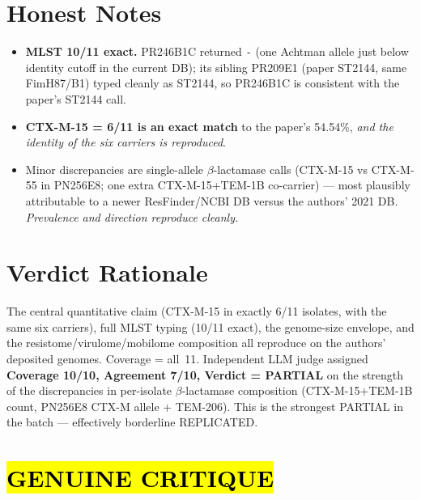 \documentclass[11pt]{article}
\begin{document}
\section{Honest Notes}
\begin{itemize}[leftmargin=1.2em]
  \item \textbf{MLST 10/11 exact.} PR246B1C returned \texttt{-} (one Achtman
        allele just below identity cutoff in the current DB); its sibling
        PR209E1 (paper ST2144, same FimH87/B1) typed cleanly as ST2144, so
        PR246B1C is consistent with the paper's ST2144 call.
  \item \textbf{CTX-M-15 = 6/11 is an exact match} to the paper's 54.54\%,
        \emph{and the identity of the six carriers is reproduced}.
  \item Minor discrepancies are single-allele $\beta$-lactamase calls (CTX-M-15
        vs CTX-M-55 in PN256E8; one extra CTX-M-15+TEM-1B co-carrier)
        --- most plausibly attributable to a newer ResFinder/NCBI DB versus
        the authors' 2021 DB. \emph{Prevalence and direction reproduce
        cleanly.}
\end{itemize}

\section{Verdict Rationale}
The central quantitative claim (CTX-M-15 in exactly 6/11 isolates, with the
same six carriers), full MLST typing (10/11 exact), the genome-size envelope,
and the resistome/virulome/mobilome composition all reproduce on the authors'
deposited genomes. Coverage = all~11. Independent LLM judge assigned
\textbf{Coverage 10/10, Agreement 7/10, Verdict = PARTIAL} on the strength of
the discrepancies in per-isolate $\beta$-lactamase composition
(CTX-M-15+TEM-1B count, PN256E8 CTX-M allele + TEM-206). This is the
strongest PARTIAL in the batch --- effectively borderline REPLICATED.

\section*{\hl{GENUINE CRITIQUE}}
\end{document}
